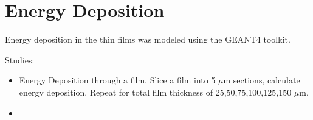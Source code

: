 \section{Energy Deposition}

Energy deposition in the thin films was modeled using the GEANT4 toolkit.

Studies:
\begin{itemize}
    \item Energy Deposition through a film. Slice a film into 5 $\mu$m sections, calculate energy deposition. Repeat for total film thickness of 25,50,75,100,125,150 $\mu$m.
    \item
\end{itemize}

